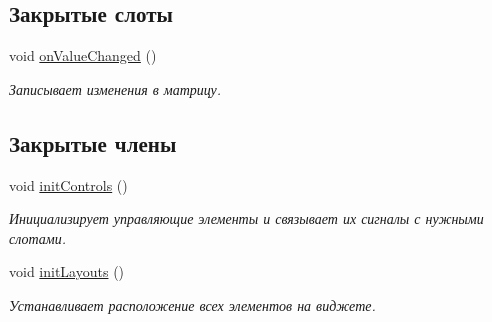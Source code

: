 \subsection*{Закрытые слоты}
\begin{DoxyCompactItemize}
\item 
void \hyperlink{class_matrix_widget_a0d0d61d1a4cf286f90026d1dfa690121}{on\+Value\+Changed} ()\hypertarget{class_matrix_widget_a0d0d61d1a4cf286f90026d1dfa690121}{}\label{class_matrix_widget_a0d0d61d1a4cf286f90026d1dfa690121}

\begin{DoxyCompactList}\small\item\em Записывает изменения в матрицу. \end{DoxyCompactList}\end{DoxyCompactItemize}
\subsection*{Закрытые члены}
\begin{DoxyCompactItemize}
\item 
void \hyperlink{class_matrix_widget_a9c693e71b54ca95204792160dfe1c4bf}{init\+Controls} ()\hypertarget{class_matrix_widget_a9c693e71b54ca95204792160dfe1c4bf}{}\label{class_matrix_widget_a9c693e71b54ca95204792160dfe1c4bf}

\begin{DoxyCompactList}\small\item\em Инициализирует управляющие элементы и связывает их сигналы с нужными слотами. \end{DoxyCompactList}\item 
void \hyperlink{class_matrix_widget_ae3c951130052ad2d93105a98c4468b13}{init\+Layouts} ()\hypertarget{class_matrix_widget_ae3c951130052ad2d93105a98c4468b13}{}\label{class_matrix_widget_ae3c951130052ad2d93105a98c4468b13}

\begin{DoxyCompactList}\small\item\em Устанавливает расположение всех элементов на виджете. \end{DoxyCompactList}\end{DoxyCompactItemize}
